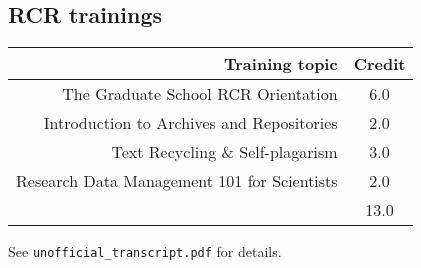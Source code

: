 \subsection{RCR trainings}

\begin{frame}[noframenumbering]{}
    \begin{table}[htb!]
        \centering
        \begin{tabular}{r|c}
            Training topic & Credit \\
            \hline
            The Graduate School RCR Orientation & 6.0 \\
            Introduction to Archives and Repositories & 2.0 \\
            Text Recycling \& Self-plagarism & 3.0 \\
            Research Data Management 101 for Scientists & 2.0 \\
            \hline
             & 13.0
        \end{tabular}
    \end{table}

    \bigskip

    See \texttt{unofficial\_transcript.pdf} for details.
\end{frame}
